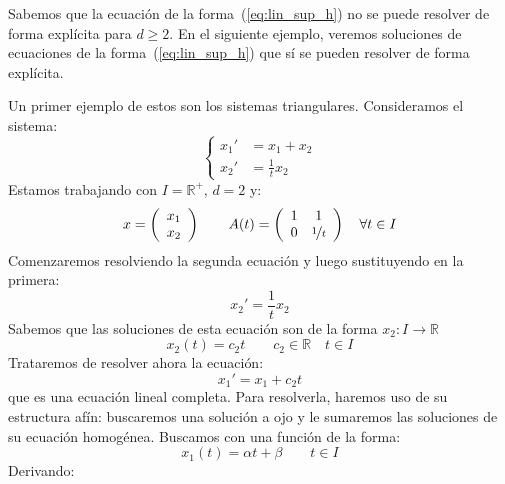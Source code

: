 \noindent
Sabemos que la ecuación de la forma~(\ref{eq:lin_sup_h}) no se puede resolver de forma explícita para $d\geq 2$. En el siguiente ejemplo, veremos soluciones de ecuaciones de la forma~(\ref{eq:lin_sup_h}) que sí se pueden resolver de forma explícita.
\begin{ejemplo}
Un primer ejemplo de estos son los sistemas triangulares.
    Consideramos el sistema:
    \begin{equation*}
        \left\{\begin{array}{rl}
                x_1' &= x_1 + x_2 \\
            x_2' &= \frac{1}{t}x_2
        \end{array}\right.
    \end{equation*}
    Estamos trabajando con $I = \mathbb{R}^+$, $d=2$ y:
    \begin{equation*}
        x = \left(\begin{array}{c}
            x_1 \\
            x_2
        \end{array}\right) \qquad A(t) = \left(\begin{array}{cc}
            1 & 1 \\
            0 & \nicefrac{1}{t}
        \end{array}\right) \quad \forall t\in I
    \end{equation*}
    Comenzaremos resolviendo la segunda ecuación y luego sustituyendo en la primera:
    \begin{equation*}
        x_2' = \dfrac{1}{t}x_2
    \end{equation*}
    Sabemos que las soluciones de esta ecuación son de la forma $x_2:I\rightarrow\mathbb{R}$
    \begin{equation*}
        x_2(t) = c_2 t \qquad c_2\in \mathbb{R} \quad t\in I
    \end{equation*}
    Trataremos de resolver ahora la ecuación:
    \begin{equation*}
        x_1' = x_1 + c_2 t
    \end{equation*}
    que es una ecuación lineal completa. Para resolverla, haremos uso de su estructura afín: buscaremos una solución a ojo y le sumaremos las soluciones de su ecuación homogénea. Buscamos con una función de la forma:
    \begin{equation*}
        x_1(t) = \alpha t + \beta \qquad t\in I
    \end{equation*}
    Derivando:
    \begin{equation*}

\end{equation*}
\end{ejemplo}
